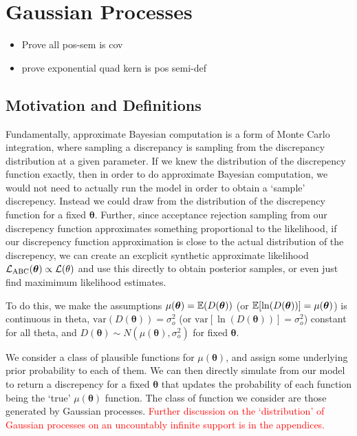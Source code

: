 \chapter{Gaussian Processes}

\begin{itemize}
    \item Prove all pos-sem is cov
    \item prove exponential quad kern is pos semi-def
\end{itemize}

\section{Motivation and Definitions}

Fundamentally, approximate Bayesian computation is a form of Monte Carlo
integration, where sampling a discrepancy is sampling from the discrepancy
distribution at a given parameter. If we knew the distribution of the
discrepency function exactly, then in order to do approximate
Bayesian computation, we would not need to actually run the model in order to
obtain a `sample' discrepency. Instead we could draw from the distribution of the
discrepency function for a fixed $\bm\theta.$ Further, since acceptance
rejection sampling from our discrepency function approximates something
proportional to the likelihood, if our discrepency function approximation is
close to the actual distribution of the discrepency, we can create an excplicit
synthetic approximate likelihood $\mathcal{L}_\text{ABC}(\bm\theta)\propto \mathcal{L}(\theta)$
and use this directly to obtain posterior samples, or even just find maximimum
likelihood estimates.

To do this, we make the assumptions $\mu(\bm\theta) = \operatorname{\mathbb{E}}(D(\bm\theta))$
(or $\operatorname{\mathbb{E}}[\ln(D(\bm\theta))] = \mu(\bm\theta)$) is
continuous in theta, $\mathrm{var}(D(\bm\theta)) = \sigma^2_o$
(or $\mathrm{var}[\ln(D(\bm\theta))] = \sigma^2_o$) constant for all theta,
and $D(\bm\theta) \sim N(\mu(\bm\theta), \sigma^2_o)$ for fixed $\bm\theta.$

We consider a class of plausible functions for $\mu(\bm\theta)$, and assign
some underlying prior
probability to each of them. We can then directly simulate from our model to
return a discrepency for a fixed $\bm\theta$ that updates the probability of
each function being the `true' $\mu(\bm\theta)$
function. The class of function we consider are those generated by Gaussian
processes. \textcolor{red}{
    Further discussion on the `distribution' of Gaussian processes on an
    uncountably infinite support is in the appendices.
}

